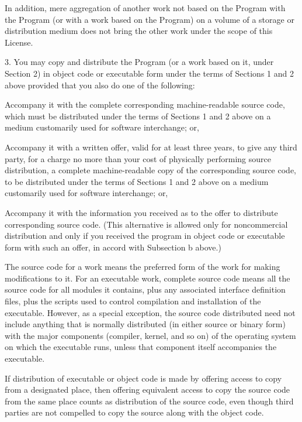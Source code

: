 \item{}In addition, mere aggregation of another work not based on the
Program with the Program (or with a work based on the Program) on a
volume of a storage or distribution medium does not bring the other work
under the scope of this License.

\item{3.} You may copy and distribute the Program (or a work based on
it, under Section 2) in object code or executable form under the terms
of Sections 1 and 2 above provided that you also do one of the
following:

 Accompany it with the complete corresponding
    machine-readable source code, which must be distributed under the
    terms of Sections 1 and 2 above on a medium customarily used for
    software interchange; or,

 Accompany it with a written offer, valid for at least
    three years, to give any third party, for a charge no more than your
    cost of physically performing source distribution, a complete
    machine-readable copy of the corresponding source code, to be
    distributed under the terms of Sections 1 and 2 above on a medium
    customarily used for software interchange; or,

 Accompany it with the information you received as to the
    offer to distribute corresponding source code.  (This alternative is
    allowed only for noncommercial distribution and only if you received
    the program in object code or executable form with such an offer, in
    accord with Subsection b above.)

\item{}The source code for a work means the preferred form of the work
for making modifications to it.  For an executable work, complete source
code means all the source code for all modules it contains, plus any
associated interface definition files, plus the scripts used to control
compilation and installation of the executable.  However, as a special
exception, the source code distributed need not include anything that is
normally distributed (in either source or binary form) with the major
components (compiler, kernel, and so on) of the operating system on
which the executable runs, unless that component itself accompanies the
executable.

\item{}If distribution of executable or object code is made by offering
access to copy from a designated place, then offering equivalent
access to copy the source code from the same place counts as
distribution of the source code, even though third parties are not
compelled to copy the source along with the object code.

